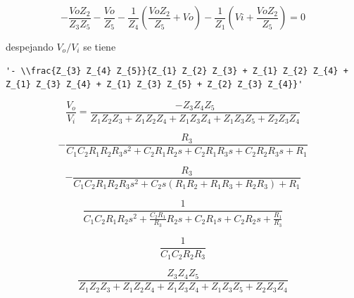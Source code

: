 \documentclass{article}
\begin{document}
    \[
- \frac{Vo Z_{2}}{Z_{3} Z_{5}} - \frac{Vo}{Z_{5}} - \frac{1}{Z_{4}} \left(\frac{Vo Z_{2}}{Z_{5}} + Vo\right) - \frac{1}{Z_{1}} \left(Vi + \frac{Vo Z_{2}}{Z_{5}}\right)=0
\]

despejando $V_{o}/V_{i}$ se tiene


    
    
    \begin{verbatim}
'- \\frac{Z_{3} Z_{4} Z_{5}}{Z_{1} Z_{2} Z_{3} + Z_{1} Z_{2} Z_{4} + Z_{1} Z_{3} Z_{4} + Z_{1} Z_{3} Z_{5} + Z_{2} Z_{3} Z_{4}}'
    \end{verbatim}

    

    \begin{equation}\label{eq:rauchtf}
\frac{V_{o}}{V_{i}}=\frac{-Z_{3} Z_{4} Z_{5}}{Z_{1} Z_{2} Z_{3} + Z_{1} Z_{2} Z_{4} + Z_{1} Z_{3} Z_{4} + Z_{1} Z_{3} Z_{5} + Z_{2} Z_{3} Z_{4}}
\end{equation}



    
    
        \begin{equation*}
        - \frac{R_{3}}{C_{1} C_{2} R_{1} R_{2} R_{3} s^{2} + C_{2} R_{1} R_{2} s + C_{2} R_{1} R_{3} s + C_{2} R_{2} R_{3} s + R_{1}}
        \end{equation*}

    


    
    
        \begin{equation*}
        - \frac{R_{3}}{C_{1} C_{2} R_{1} R_{2} R_{3} s^{2} + C_{2} s \left(R_{1} R_{2} + R_{1} R_{3} + R_{2} R_{3}\right) + R_{1}}
        \end{equation*}

    


    
    
        \begin{equation*}
        \frac{1}{C_{1} C_{2} R_{1} R_{2} s^{2} + \frac{C_{2} R_{1}}{R_{3}} R_{2} s + C_{2} R_{1} s + C_{2} R_{2} s + \frac{R_{1}}{R_{3}}}
        \end{equation*}

    


    
    
        \begin{equation*}
        \frac{1}{C_{1} C_{2} R_{2} R_{3}}
        \end{equation*}

    


    
    
        \begin{equation*}
        \frac{Z_{3} Z_{4} Z_{5}}{Z_{1} Z_{2} Z_{3} + Z_{1} Z_{2} Z_{4} + Z_{1} Z_{3} Z_{4} + Z_{1} Z_{3} Z_{5} + Z_{2} Z_{3} Z_{4}}
        \end{equation*}

    



    
    
    
    
\end{document}
